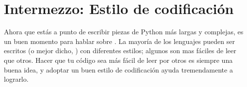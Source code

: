 \documentclass[a4,10pt,spanish]{sphinxmanual}
\begin{document}
\section{Intermezzo: Estilo de codificación}
\label{\detokenize{tutorial/controlflow:intermezzo-coding-style}}\label{\detokenize{tutorial/controlflow:tut-codingstyle}}
\ignorespaces 
\sphinxAtStartPar
Ahora que estás a punto de escribir piezas de Python más largas y complejas, es un buen momento para hablar sobre . La mayoría de los lenguajes pueden ser escritos (o mejor dicho, ) con diferentes estilos; algunos son mas fáciles de leer que otros. Hacer que tu código sea más fácil de leer por otros es siempre una buena idea, y adoptar un buen estilo de codificación ayuda tremendamente a lograrlo.
\end{document}
